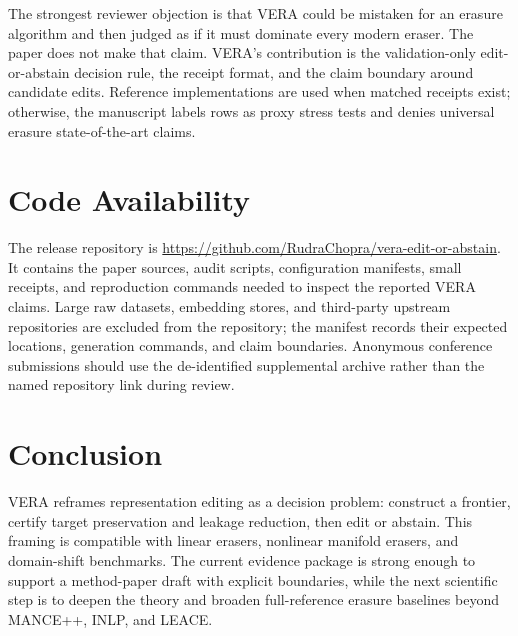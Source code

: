 \documentclass[10pt]{article}
\begin{document}
The strongest reviewer objection is that VERA could be mistaken for an erasure
algorithm and then judged as if it must dominate every modern eraser. The paper
does not make that claim. VERA's contribution is the validation-only
edit-or-abstain decision rule, the receipt format, and the claim boundary around
candidate edits. Reference implementations are used when matched receipts
exist; otherwise, the manuscript labels rows as proxy stress tests and denies
universal erasure state-of-the-art claims.

\section{Code Availability}

The release repository is
\url{https://github.com/RudraChopra/vera-edit-or-abstain}. It contains the
paper sources, audit scripts, configuration manifests, small receipts, and
reproduction commands needed to inspect the reported VERA claims. Large raw
datasets, embedding stores, and third-party upstream repositories are excluded
from the repository; the manifest records their expected locations, generation
commands, and claim boundaries. Anonymous conference submissions should use the
de-identified supplemental archive rather than the named repository link during
review.

\section{Conclusion}

VERA reframes representation editing as a decision problem: construct a
frontier, certify target preservation and leakage reduction, then edit or
abstain. This framing is compatible with linear erasers, nonlinear manifold
erasers, and domain-shift benchmarks. The current evidence package is strong
enough to support a method-paper draft with explicit boundaries, while the next
scientific step is to deepen the theory and broaden full-reference erasure
baselines beyond MANCE++, INLP, and LEACE.
\end{document}
